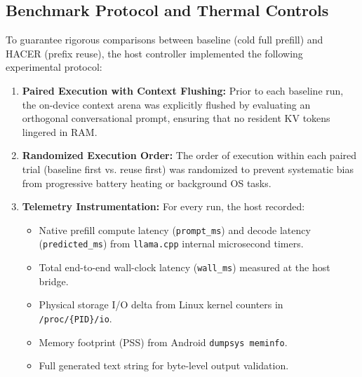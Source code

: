 \subsection{Benchmark Protocol and Thermal Controls}
To guarantee rigorous comparisons between baseline (cold full prefill) and HACER (prefix reuse), the host controller implemented the following experimental protocol:
\begin{enumerate}
    \item \textbf{Paired Execution with Context Flushing:} Prior to each baseline run, the on-device context arena was explicitly flushed by evaluating an orthogonal conversational prompt, ensuring that no resident KV tokens lingered in RAM.
    \item \textbf{Randomized Execution Order:} The order of execution within each paired trial (baseline first vs. reuse first) was randomized to prevent systematic bias from progressive battery heating or background OS tasks.
    \item \textbf{Telemetry Instrumentation:} For every run, the host recorded:
    \begin{itemize}
        \item Native prefill compute latency (\texttt{prompt\_ms}) and decode latency (\texttt{predicted\_ms}) from \texttt{llama.cpp} internal microsecond timers.
        \item Total end-to-end wall-clock latency (\texttt{wall\_ms}) measured at the host bridge.
        \item Physical storage I/O delta from Linux kernel counters in \texttt{/proc/\{PID\}/io}.
        \item Memory footprint (PSS) from Android \texttt{dumpsys meminfo}.
        \item Full generated text string for byte-level output validation.
    \end{itemize}
\end{enumerate}
